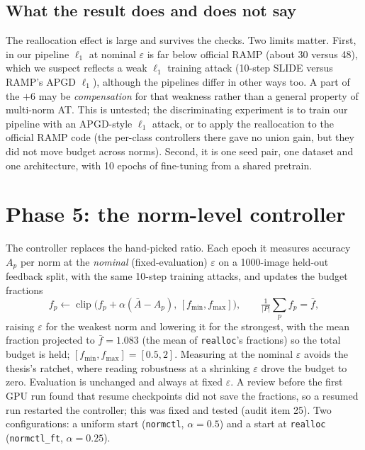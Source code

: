 \documentclass[11pt]{article}
\begin{document}
\subsection{What the result does and does not say}
The reallocation effect is large and survives the checks. Two limits matter. First, in our pipeline $\ell_1$ at nominal $\varepsilon$ is far below official RAMP (about 30 versus 48), which we suspect reflects a weak $\ell_1$ training attack (10-step SLIDE versus RAMP's APGD $\ell_1$), although the pipelines differ in other ways too.
A part of the $+6$ may be \emph{compensation} for that weakness rather than a general property of multi-norm AT. This is untested; the discriminating experiment is to train our pipeline with an APGD-style $\ell_1$ attack, or to apply the reallocation to the official RAMP code (the per-class controllers there gave no union gain, but they did not move budget across norms).
Second, it is one seed pair, one dataset and one architecture, with 10 epochs of fine-tuning from a shared pretrain.

\section{Phase 5: the norm-level controller}\label{sec:ctl}
The controller replaces the hand-picked ratio. Each epoch it measures accuracy $A_p$ per norm at the \emph{nominal} (fixed-evaluation) $\varepsilon$ on a 1000-image held-out feedback split, with the same 10-step training attacks, and updates the budget fractions
\[
f_p \leftarrow \operatorname{clip}\bigl(f_p + \alpha(\bar A - A_p),\,[f_{\min},f_{\max}]\bigr),\qquad \tfrac1{|P|}\sum_p f_p = \bar f,
\]
raising $\varepsilon$ for the weakest norm and lowering it for the strongest, with the mean fraction projected to $\bar f=1.083$ (the mean of \texttt{realloc}'s fractions) so the total budget is held; $[f_{\min},f_{\max}]=[0.5,2]$.
Measuring at the nominal $\varepsilon$ avoids the thesis's ratchet, where reading robustness at a shrinking $\varepsilon$ drove the budget to zero. Evaluation is unchanged and always at fixed $\varepsilon$.
A review before the first GPU run found that resume checkpoints did not save the fractions, so a resumed run restarted the controller; this was fixed and tested (audit item 25).
Two configurations: a uniform start (\texttt{normctl}, $\alpha=0.5$) and a start at \texttt{realloc} (\texttt{normctl\_ft}, $\alpha=0.25$).
\end{document}
